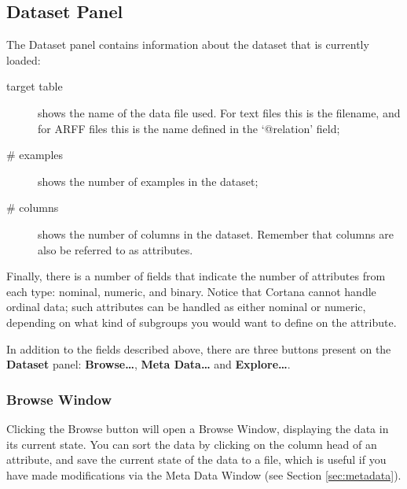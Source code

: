 \documentclass{article}
\begin{document}
\subsection{Dataset Panel}
\label{sec:dataset}


The Dataset panel contains information about the dataset that is currently
loaded:
\begin{description}
\item[target table] shows the name of the data file used. For text
files this is the filename, and for ARFF files this is the name defined in the
`@relation' field;
\item[\# examples] shows the number of examples in the dataset;
\item[\# columns] shows the number of columns in the dataset.
Remember that columns are also be referred to as attributes.
\end{description}
Finally, there is a number of fields that indicate the number of attributes
from each \gls{type}: \gls{nominal}, \gls{numeric}, and \gls{binary}. Notice
that Cortana cannot handle \gls{ordinal} data; such attributes can be
handled as either \gls{nominal} or \gls{numeric}, depending on what kind of
subgroups you would want to define on the attribute.

In addition to the fields described above, there are three buttons present
on the {\bf Dataset} panel: {\bf Browse\ldots}, {\bf Meta Data\ldots} and
{\bf Explore\ldots}.

\subsubsection{Browse Window}

Clicking the Browse button will open a Browse Window, displaying the
data in its current state.  You can sort the data by clicking on the column
head of an attribute, and save the current state of the data to a file,
which is useful if you have made modifications via the Meta Data Window (see
Section \ref{sec:metadata}).

\end{document}
